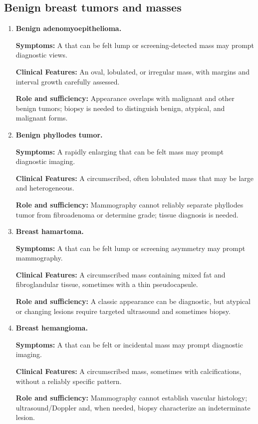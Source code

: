 \subsection{Benign breast tumors and masses}
\begin{enumerate}[leftmargin=*,itemsep=0.45em,topsep=0.4em]
\item \textbf{Benign adenomyoepithelioma.}\par\noindent\textbf{Symptoms:} A that can be felt lump or screening-detected mass may prompt diagnostic views.\par\noindent\textbf{Clinical Features:} An oval, lobulated, or irregular mass, with margins and interval growth carefully assessed.\par\noindent\textbf{Role and sufficiency:} Appearance overlaps with malignant and other benign tumors; biopsy is needed to distinguish benign, atypical, and malignant forms.
\item \textbf{Benign phyllodes tumor.}\par\noindent\textbf{Symptoms:} A rapidly enlarging that can be felt mass may prompt diagnostic imaging.\par\noindent\textbf{Clinical Features:} A circumscribed, often lobulated mass that may be large and heterogeneous.\par\noindent\textbf{Role and sufficiency:} Mammography cannot reliably separate phyllodes tumor from fibroadenoma or determine grade; tissue diagnosis is needed.
\item \textbf{Breast hamartoma.}\par\noindent\textbf{Symptoms:} A that can be felt lump or screening asymmetry may prompt mammography.\par\noindent\textbf{Clinical Features:} A circumscribed mass containing mixed fat and fibroglandular tissue, sometimes with a thin pseudocapsule.\par\noindent\textbf{Role and sufficiency:} A classic appearance can be diagnostic, but atypical or changing lesions require targeted ultrasound and sometimes biopsy.
\item \textbf{Breast hemangioma.}\par\noindent\textbf{Symptoms:} A that can be felt or incidental mass may prompt diagnostic imaging.\par\noindent\textbf{Clinical Features:} A circumscribed mass, sometimes with calcifications, without a reliably specific pattern.\par\noindent\textbf{Role and sufficiency:} Mammography cannot establish vascular histology; ultrasound/Doppler and, when needed, biopsy characterize an indeterminate lesion.

\end{enumerate}
